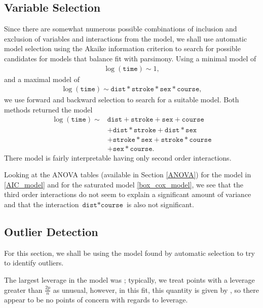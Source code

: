 \documentclass[a4paper,11pt]{article}
\begin{document}
\subsection{Variable Selection}

Since there are somewhat numerous possible combinations of inclusion and exclusion of variables and interactions from the model, we shall use automatic model selection using the Akaike information criterion to search for possible candidates for models that balance fit with parsimony. Using a minimal model of
\begin{align}
  \log(\texttt{time}) \sim 1,
\end{align}
and a maximal model of
\begin{align}
  \log(\texttt{time}) \sim \texttt{dist}*\texttt{stroke}*\texttt{sex}*\texttt{course},
\end{align}
we use forward and backward selection to search for a suitable model. Both methods returned the model
\begin{align}
  \log(\texttt{time}) \sim &\texttt{dist} + \texttt{stroke} + \texttt{sex} + \texttt{course} \nonumber \\
  & + \texttt{dist}*\texttt{stroke} + \texttt{dist}*\texttt{sex} \nonumber \\
  & + \texttt{stroke}*\texttt{sex} + \texttt{stroke}*\texttt{course} \nonumber \\
  & + \texttt{sex}*\texttt{course}. \label{AIC_model}
\end{align}
There model is fairly interpretable having only second order interactions.

Looking at the ANOVA tables (available in Section \ref{ANOVA}) for the model in \eqref{AIC_model} and for the saturated model \eqref{box_cox_model}, we see that the third order interactions do not seem to explain a significant amount of variance and that the interaction $\texttt{dist}*\texttt{course}$ is also not significant.

\subsection{Outlier Detection}

For this section, we shall be using the model found by automatic selection to try to identify outliers.

The largest leverage in the model was \savedvs[6,2]; typically, we treat points with a leverage greater than $\frac{2p}{n}$ as unusual, however, in this fit, this quantity is given by \savedvs[7,2], so there appear to be no points of concern with regards to leverage.
\end{document}
